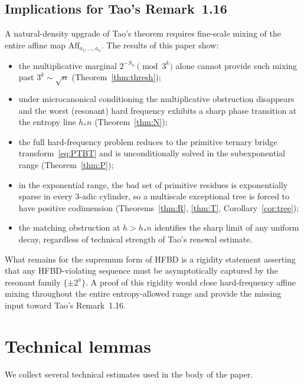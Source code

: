 \documentclass[11pt,a4paper]{amsart}
\theoremstyle{plain}
\theoremstyle{definition}
\newcommand{\Aff}{\mathrm{Aff}}
\begin{document}
\subsection*{Implications for Tao's Remark~1.16}
A natural-density upgrade of Tao's theorem requires fine-scale mixing of
the entire affine map $\Aff_{a_1,\dots,a_n}$.
The results of this paper show:
\begin{itemize}
\item the multiplicative marginal $2^{-S_n}\pmod{3^k}$ alone cannot
provide such mixing past $3^k\sim\sqrt n$ (Theorem~\ref{thm:thresh});
\item under microcanonical conditioning the multiplicative obstruction
disappears and the worst (resonant) hard frequency exhibits a sharp phase
transition at the entropy line $h_\ast n$ (Theorem~\ref{thm:N});
\item the full hard-frequency problem reduces to the primitive ternary
bridge transform~\eqref{eq:PTBT} and is unconditionally solved in the
subexponential range (Theorem~\ref{thm:P});
\item in the exponential range, the bad set of primitive residues is
exponentially sparse in every $3$-adic cylinder, so a multiscale
exceptional tree is forced to have positive codimension
(Theorems~\ref{thm:R}, \ref{thm:T}, Corollary~\ref{cor:tree});
\item the matching obstruction at $h>h_\ast n$ identifies the sharp limit
of any uniform decay, regardless of technical strength of Tao's renewal
estimate.
\end{itemize}
What remains for the supremum form of HFBD is a rigidity statement
asserting that any HFBD-violating sequence must be asymptotically
captured by the resonant family $\{\pm 2^a\}$.
A proof of this rigidity would close hard-frequency affine mixing
throughout the entire entropy-allowed range and provide the missing
input toward Tao's Remark~1.16.

\appendix

\section{Technical lemmas}\label{app:tech}

We collect several technical estimates used in the body of the paper.
\end{document}

